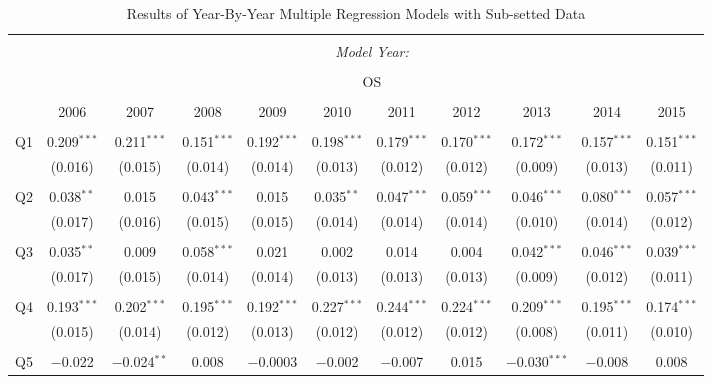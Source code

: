 \documentclass[11pt,a4paper]{report}
\begin{document}
\begin{table}
[p] \centering \tiny
\caption{Results of Year-By-Year Multiple Regression Models with Sub-setted Data} 
\label{table:yearonyear} 
\begin{tabular}{@{\extracolsep{8pt}}lcccccccccc} 
	\\[-1.8ex]\hline 
	\hline \\[-1.8ex] 
	& \multicolumn{10}{c}{\textit{Model Year:}} \\ 
	\cline{2-11} 
	\\[-1.8ex] & \multicolumn{10}{c}{OS} \\ 
	\\[-1.8ex] & 2006 & 2007 & 2008 & 2009 & 2010 & 2011 & 2012 & 2013 & 2014 & 2015\\ 
	\hline \\[-1.8ex] 
	Q1 & 0.209$^{***}$ & 0.211$^{***}$ & 0.151$^{***}$ & 0.192$^{***}$ & 0.198$^{***}$ & 0.179$^{***}$ & 0.170$^{***}$ & 0.172$^{***}$ & 0.157$^{***}$ & 0.151$^{***}$ \\ 
	& (0.016) & (0.015) & (0.014) & (0.014) & (0.013) & (0.012) & (0.012) & (0.009) & (0.013) & (0.011) \\ 
	& & & & & & & & & & \\ 
	Q2 & 0.038$^{**}$ & 0.015 & 0.043$^{***}$ & 0.015 & 0.035$^{**}$ & 0.047$^{***}$ & 0.059$^{***}$ & 0.046$^{***}$ & 0.080$^{***}$ & 0.057$^{***}$ \\ 
	& (0.017) & (0.016) & (0.015) & (0.015) & (0.014) & (0.014) & (0.014) & (0.010) & (0.014) & (0.012) \\ 
	& & & & & & & & & & \\ 
	Q3 & 0.035$^{**}$ & 0.009 & 0.058$^{***}$ & 0.021 & 0.002 & 0.014 & 0.004 & 0.042$^{***}$ & 0.046$^{***}$ & 0.039$^{***}$ \\ 
	& (0.017) & (0.015) & (0.014) & (0.014) & (0.013) & (0.013) & (0.013) & (0.009) & (0.012) & (0.011) \\ 
	& & & & & & & & & & \\ 
	Q4 & 0.193$^{***}$ & 0.202$^{***}$ & 0.195$^{***}$ & 0.192$^{***}$ & 0.227$^{***}$ & 0.244$^{***}$ & 0.224$^{***}$ & 0.209$^{***}$ & 0.195$^{***}$ & 0.174$^{***}$ \\ 
	& (0.015) & (0.014) & (0.012) & (0.013) & (0.012) & (0.012) & (0.012) & (0.008) & (0.011) & (0.010) \\ 
	& & & & & & & & & & \\ 
	Q5 & $-$0.022 & $-$0.024$^{**}$ & 0.008 & $-$0.0003 & $-$0.002 & $-$0.007 & 0.015 & $-$0.030$^{***}$ & $-$0.008 & 0.008 \\ 

\end{tabular}
\end{table}
\end{document}
